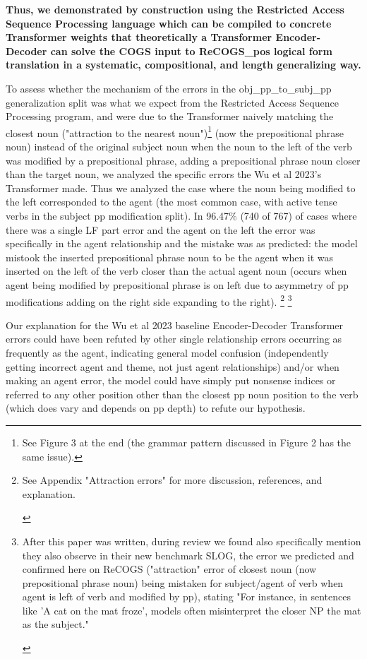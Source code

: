 \documentclass[11pt]{article}
\begin{document}
\textbf{Thus, we demonstrated by construction using the Restricted Access Sequence Processing language which can be compiled to concrete Transformer weights that theoretically a Transformer Encoder-Decoder can solve the COGS input to ReCOGS\_pos logical form translation in a systematic, compositional, and length generalizing way.}

To assess whether the mechanism of the errors in the obj\_pp\_to\_subj\_pp generalization split was what we expect from the Restricted Access Sequence Processing program, and were due to the Transformer naively matching the closest noun ("attraction to the nearest noun")\footnote{
See Figure 3 at the end (the grammar pattern discussed in Figure 2 has the same issue).
} (now the prepositional phrase noun) instead of the original subject noun when the noun to the left of the verb was modified by a prepositional phrase, adding a prepositional phrase noun closer than the target noun, we analyzed the specific errors the Wu et al 2023's Transformer made. Thus we analyzed the case where the noun being modified to the left corresponded to the agent (the most common case, with active tense verbs in the subject pp modification split). In 96.47\% (740 of 767) of cases where there was a single LF part error and the agent on the left the error was specifically in the agent relationship and the mistake was as predicted: the model mistook the inserted prepositional phrase noun to be the agent when it was inserted on the left of the verb closer than the actual agent noun (occurs when agent being modified by prepositional phrase is on left due to asymmetry of pp modifications adding on the right side expanding to the right).
\footnote{
\begin{tiny}
See Appendix "Attraction errors" for more discussion, references, and explanation.
\end{tiny}
}
\footnote{
\begin{tiny}
After this paper was written, during review we found \cite{li2023slogstructuralgeneralizationbenchmark} also specifically mention they also observe in their new benchmark SLOG, the error we predicted and confirmed here on ReCOGS ("attraction" error of closest noun (now prepositional phrase noun) being mistaken for subject/agent of verb when agent is left of verb and modified by pp), stating "For instance, in sentences like 'A cat on the mat froze', models often misinterpret the closer NP the mat as the subject."
\end{tiny}
}

Our explanation for the Wu et al 2023 baseline Encoder-Decoder Transformer errors could have been refuted by other single relationship errors occurring as frequently as the agent, indicating general model confusion (independently getting incorrect agent and theme, not just agent relationships) and/or when making an agent error, the model could have simply put nonsense indices or referred to any other position other than the closest pp noun position to the verb (which does vary and depends on pp depth) to refute our hypothesis.
\end{document}
